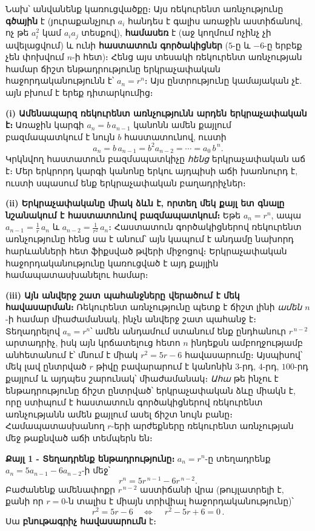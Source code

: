 \documentclass[11pt,a4paper]{article}
\begin{document}
\begin{ideabox}
Նախ՝ անվանենք կառուցվածքը։ Այս ռեկուրենտ առնչությունը \textbf{գծային} է (յուրաքանչյուր $a_i$
հանդես է գալիս առաջին աստիճանով, ոչ թե $a_i^2$ կամ $a_ia_j$ տեսքով), \textbf{համասեռ} է (աջ կողմում
ոչինչ չի ավելացվում) և ունի \textbf{հաստատուն գործակիցներ} ($5$-ը և $-6$-ը երբեք չեն փոխվում
$n$-ի հետ)։ Հենց այս տեսակի ռեկուրենտ առնչության համար ճիշտ ենթադրությունը երկրաչափական
հաջորդականությունն է՝ $a_n=r^n$։ Այս ընտրությունը կամայական չէ. այն բխում է երեք դիտարկումից։

\textbf{(i) Ամենապարզ ռեկուրենտ առնչությունն արդեն երկրաչափական է։} Առաջին կարգի $a_n=b\,a_{n-1}$
կանոնն ամեն քայլում բազմապատկում է նույն $b$ հաստատունով, ուստի
\[
a_n=b\,a_{n-1}=b^2a_{n-2}=\cdots=a_0\,b^{\,n}.
\]
Կրկնվող հաստատուն բազմապատկիչը \emph{հենց} երկրաչափական աճ է։ Մեր երկրորդ կարգի կանոնը
երկու այդպիսի աճի խառնուրդ է, ուստի սպասում ենք երկրաչափական բաղադրիչներ։

\textbf{(ii) Երկրաչափականը միակ ձևն է, որտեղ մեկ քայլ ետ գնալը նշանակում է հաստատունով
բազմապատկում։} Եթե $a_n=r^n$, ապա $a_{n-1}=\tfrac1r\,a_n$ և $a_{n-2}=\tfrac1{r^2}\,a_n$։
Հաստատուն գործակիցներով ռեկուրենտ առնչությունը հենց սա է անում՝ այն կապում է անդամը նախորդ
հարևանների հետ ֆիքսված թվերի միջոցով։ Երկրաչափական հաջորդականությունը կառուցված է այդ
քայլին համապատասխանելու համար։

\textbf{(iii) Այն անվերջ շատ պահանջները վերածում է մեկ հավասարման։} Ռեկուրենտ առնչությունը պետք է
ճիշտ լինի \emph{ամեն} $n$-ի համար միաժամանակ, ինչն անվերջ շատ պահանջ է։ Տեղադրելով $a_n=r^n$՝ ամեն
անդամում ստանում ենք ընդհանուր $r^{\,n-2}$ արտադրիչ, իսկ այն կրճատելուց հետո $n$ ինդեքսն
ամբողջությամբ անհետանում է՝ մնում է միակ $r^2=5r-6$ հավասարումը։ Այսպիսով՝ մեկ լավ ընտրված $r$
թիվը բավարարում է կանոնին $3$-րդ, $4$-րդ, $100$-րդ քայլում և այդպես շարունակ՝ միաժամանակ։
\emph{Ահա} թե ինչու է ենթադրությունը ճիշտ ընտրված՝ երկրաչափական ձևը միակն է, որը ստիպում է
հաստատուն գործակիցներով ռեկուրենտ առնչությանն ամեն քայլում ասել ճիշտ նույն բանը։ Համապատասխանող
$r$-երի արժեքները ռեկուրենտ առնչության մեջ թաքնված աճի տեմպերն են։
\end{ideabox}

\textbf{Քայլ 1 - Տեղադրենք ենթադրությունը։}
$a_n=r^n$-ը տեղադրենք $a_n=5a_{n-1}-6a_{n-2}$-ի մեջ՝
\[
r^n = 5r^{\,n-1} - 6r^{\,n-2}.
\]
Բաժանենք ամենափոքր $r^{\,n-2}$ աստիճանի վրա (թույլատրելի է, քանի որ $r=0$-ն տալիս է միայն
տրիվիալ հաջորդականությունը)՝
\[
r^2 = 5r - 6 \quad\Longleftrightarrow\quad \boxed{\,r^2 - 5r + 6 = 0\,}.
\]
Սա \textbf{բնութագրիչ հավասարումն} է։
\end{document}
